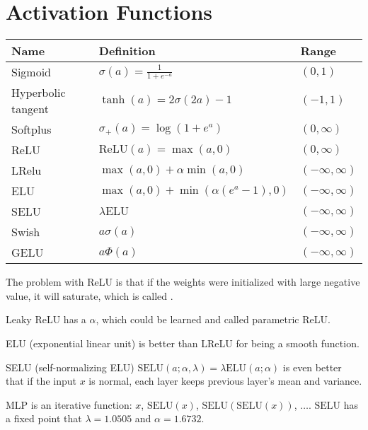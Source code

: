 
\section{Activation Functions}

\begin{table}[H]
\centering
\begin{tabular}[t]{lll}
Name & Definition & Range \\ \hline
Sigmoid & $\sigma(a) = \frac{1}{1 + e^{-a}}$ & $(0,1)$ \\
Hyperbolic tangent & $\tanh(a) = 2\sigma(2a) -1$ & $(-1,1)$ \\
Softplus & $\sigma_{+}(a) = \log(1 + e^a)$ & $(0,\infty)$ \\
ReLU & $\text{ReLU}(a) = \max(a,0)$ & $(0,\infty)$ \\
LRelu & $\max(a,0)+\alpha \min(a,0)$ & $(-\infty , \infty)$ \\
ELU & $\max(a,0) + \min(\alpha(e^a - 1), 0)$ & $(-\infty , \infty)$ \\
SELU & $\lambda \text{ELU}$ &$(-\infty , \infty)$ \\
Swish & $a\sigma(a)$ &$(-\infty , \infty)$ \\
GELU & $a \Phi(a)$ &$(-\infty , \infty)$ \\
\end{tabular}
\end{table}

\begin{example}[Relu]
    The problem with ReLU is that if the weights were initialized with large negative value, it will saturate, which is called .
\end{example}

\begin{example}[LReLU]
    Leaky ReLU has a $\alpha$, which could be learned and called parametric ReLU.    
\end{example}

\begin{example}[ELU]
    ELU (exponential linear unit) is better than LReLU for being a smooth function.    
\end{example}


\begin{definition}[SELU]
    SELU (self-normalizing ELU) $\text{SELU}(a;\alpha,\lambda) = \lambda \text{ELU}(a;\alpha)$ is even better that if the input $x$ is normal, each layer keeps previous layer's mean and variance.     
    
    MLP is an iterative function: $x$, $\text{SELU}(x)$, $\text{SELU}(\text{SELU}(x))$, $\dots$. $\text{SELU}$ has a fixed point that $\lambda = 1.0505$ and $\alpha = 1.6732$. 

\end{definition}



